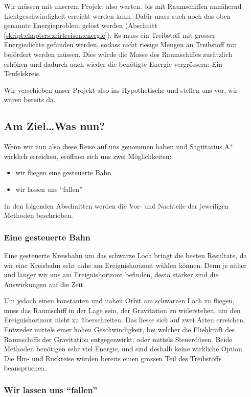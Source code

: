 \begin{refsection}
	Wir müssen mit unserem Projekt also warten, bis mit Raumschiffen annähernd Lichtgeschwindigkeit erreicht werden kann. Dafür muss auch noch das oben genannte Energieproblem gelöst werden (Abschnitt \ref{skript:chapters:zrirtreisen:energie}). Es muss ein Treibstoff mit grosser Energiedichte gefunden werden, sodass nicht riesige Mengen an Treibstoff mit befördert werden müssen. Dies würde die Masse des Raumschiffes zusätzlich erhöhen und dadurch auch wieder die benötigte Energie vergrössern: Ein Teufelskreis.
    
	Wir verschieben unser Projekt also ins Hypothetische und stellen uns vor, wir wären bereits da.
	
	\subsection{Am Ziel\dots Was nun?}
	Wenn wir nun also diese Reise auf uns genommen haben und Sagittarius A* wirklich erreichen, eröffnen sich uns zwei Möglichkeiten:
	\begin{itemize}
		\item wir fliegen eine gesteuerte Bahn
		\item wir lassen uns ``fallen''
	\end{itemize}
	In den folgenden Abschnitten werden die Vor- und Nachteile der jeweiligen Methoden beschrieben.
	
	\subsubsection{Eine gesteuerte Bahn}
	Eine gesteuerte Kreisbahn um das schwarze Loch bringt die besten Resultate, da wir eine Kreisbahn sehr nahe am Ereignishorizont wählen können. Denn je näher und länger wir uns am Ereignishorizont befinden, desto stärker sind die Auswirkungen auf die Zeit. 
    
	Um jedoch einen konstanten und nahen Orbit am schwarzen Loch zu fliegen, muss das Raumschiff in der Lage sein, der Gravitation zu widerstehen, um den Ereignishorizont nicht zu überschreiten. Das liesse sich auf zwei Arten erreichen. Entweder mittels einer hohen Geschwindigkeit, bei welcher die Fliehkraft des Raumschiffs der Gravitation entgegenwirkt, oder mittels Steuerdüsen. 
	Beide Methoden benötigen sehr viel Energie, und sind deshalb keine wirkliche Option. Die Hin- und Rückreise würden bereits einen grossen Teil des Treibstoffs beanspruchen.
	\subsubsection{Wir lassen uns ``fallen''}
	

\end{refsection}

